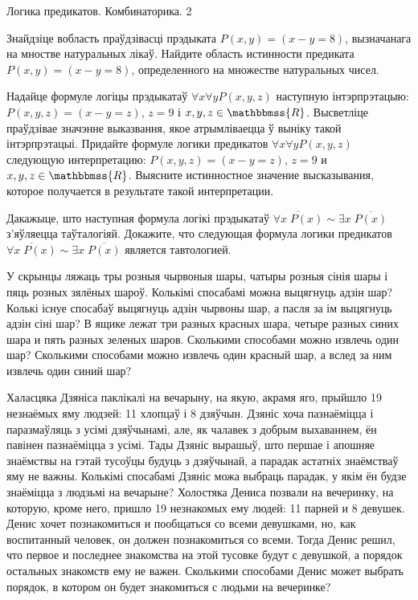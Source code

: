 \documentclass[11pt]{article}
\begin{document}
\newpage

{Логика предикатов. Комбинаторика.}
{2}
 
\begin{problemList}

\problemItemSimple
{Знайдзіце вобласть праўдзівасці прэдыката $P(x, y) = (x - y = 8)$, вызначанага на мностве натуральных лікаў.}
{Найдите область истинности предиката $P(x, y) = (x - y = 8)$, определенного на множестве натуральных чисел.}

\medskip

\problemItemSimple
{Надайце формуле логіцы прэдыкатаў $\forall x \forall y P(x, y, z)$ наступную інтэрпрэтацыю: $P(x, y, z) = (x - y = z)$, $z = 9$ і $x, y, z \in \mathbbmss{R}$.
Высветліце праўдзівае значэнне выказвання, якое атрымліваецца ў выніку такой інтэрпрэтацыі.}
{Придайте формуле логики предикатов $\forall x \forall y P(x, y, z)$ следующую интерпретацию: $P(x, y, z) = (x - y = z)$, $z = 9$ и $x, y, z \in \mathbbmss{R}$.
Выясните истинностное значение высказывания, которое получается в результате такой интерпретации.}

\medskip

\problemItemSimple
{Дакажыце, што наступная формула логікі прэдыкатаў $\overline{\forall x\;P(x)} \sim \exists x\;\overline{P(x)}$ з'яўляецца таўталогіяй.}
{Докажите, что следующая формула логики предикатов $\overline{\forall x\;P(x)} \sim \exists x\;\overline{P(x)}$ является тавтологией.}

\medskip

\problemItemSimple
{У скрынцы ляжаць тры розныя чырвоныя шары, чатыры розныя сінія шары і пяць розных зялёных шароў.
Колькімі спосабамі можна выцягнуць адзін шар? Колькі існуе спосабаў выцягнуць адзін чырвоны шар,
а пасля за ім выцягнуць адзін сіні шар?}
{В ящике лежат три разных красных шара, четыре разных синих шара и пять разных зеленых шаров.
Сколькими способами можно извлечь один шар?
Сколькими способами можно извлечь один красный шар, а вслед за ним извлечь один синий шар?}

\medskip

\problemItemSimple
{Халасцяка Дзяніса паклікалі на вечарыну, на якую, акрамя яго, прыйшло 19 незнаёмых яму людзей: 11 хлопцаў і 8 дзяўчын.
Дзяніс хоча пазнаёміцца і паразмаўляць з усімі дзяўчынамі, але, як чалавек з добрым выхаваннем, ён павінен пазнаёміцца з усімі.
Тады Дзяніс вырашыў, што першае і апошняе знаёмствы на гэтай тусоўцы будуць з дзяўчынай, а парадак астатніх знаёмстваў яму не важны.
Колькімі спосабамі Дзяніс можа выбраць парадак, у якім ён будзе знаёміцца з людзьмі на вечарыне?}
{Холостяка Дениса позвали на вечеринку, на которую, кроме него, пришло 19 незнакомых ему людей: 11 парней и 8 девушек.
Денис хочет познакомиться и пообщаться со всеми девушками, но, как воспитанный человек, он должен познакомиться со всеми.
Тогда Денис решил, что первое и последнее знакомства на этой тусовке будут с девушкой, а порядок остальных знакомств ему не важен.
Сколькими способами Денис может выбрать порядок, в котором он будет знакомиться с людьми на вечеринке?}


\end{problemList}
\end{document}
